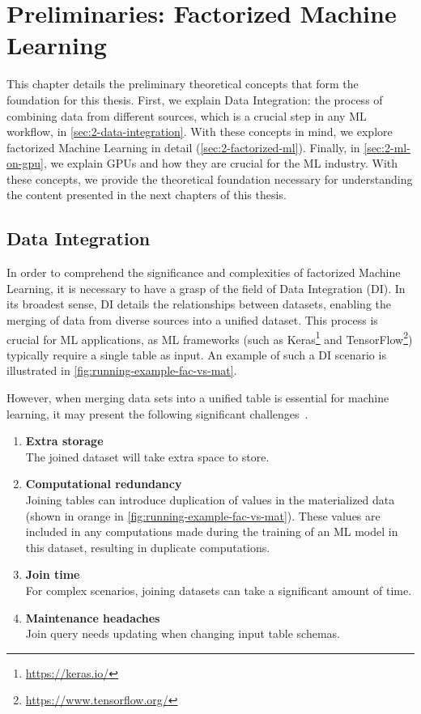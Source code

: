 
\chapter{Preliminaries: Factorized Machine Learning}
\label{chapter:preliminary}

This chapter details the preliminary theoretical concepts that form the foundation for this thesis. First, we explain Data Integration: the process of combining data from different sources, which is a crucial step in any ML workflow, in \autoref{sec:2-data-integration}. With these concepts in mind, we explore factorized Machine Learning in detail (\autoref{sec:2-factorized-ml}). Finally, in \autoref{sec:2-ml-on-gpu}, we explain GPUs and how they are crucial for the ML industry. With these concepts, we provide the theoretical foundation necessary for understanding the content presented in the next chapters of this thesis.


\section{Data Integration}
\label{sec:2-data-integration}
In order to comprehend the significance and complexities of factorized Machine Learning, it is necessary to have a grasp of the field of Data Integration (DI). In its broadest sense, DI details the relationships between datasets, enabling the merging of data from diverse sources into a unified dataset. This process is crucial for ML applications, as ML frameworks (such as Keras\footnote{\url{https://keras.io/}} and TensorFlow\footnote{\url{https://www.tensorflow.org/}}) typically require a single table as input. An example of such a DI scenario is illustrated in \autoref{fig:running-example-fac-vs-mat}.

However, when merging data sets into a unified table is essential for machine learning, it may present the following significant challenges~\cite{data-management-in-ML-kumar-2017}.

\begin{enumerate}
  \item \textbf{Extra storage}\\ The joined dataset will take extra space to store.
  \item \textbf{Computational redundancy} \\ Joining tables can introduce duplication of values in the materialized data (shown in orange in \autoref{fig:running-example-fac-vs-mat}). These values are included in any computations made during the training of an ML model in this dataset, resulting in duplicate computations.
  \item \textbf{Join time} \\For complex scenarios, joining datasets can take a significant amount of time.
  \item \textbf{Maintenance headaches} \\Join query needs updating when changing input table schemas.
\end{enumerate}

